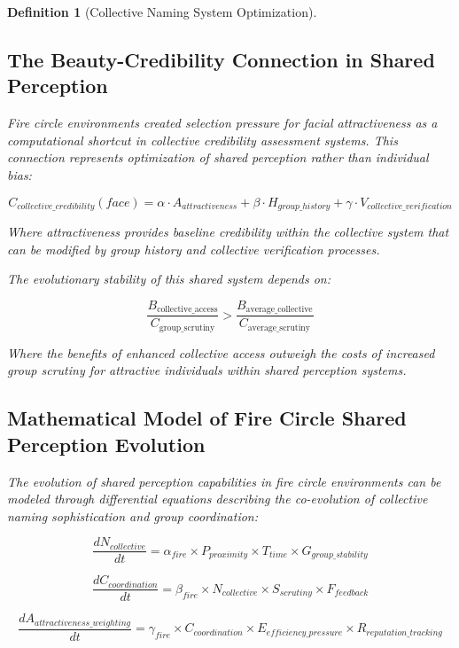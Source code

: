 \documentclass[12pt]{article}
\newtheorem{definition}{Definition}
\begin{document}
\begin{definition}[Collective Naming System Optimization]
\subsection{The Beauty-Credibility Connection in Shared Perception}

Fire circle environments created selection pressure for facial attractiveness as a computational shortcut in collective credibility assessment systems. This connection represents optimization of shared perception rather than individual bias:

$$C_{collective\_credibility}(face) = \alpha \cdot A_{attractiveness} + \beta \cdot H_{group\_history} + \gamma \cdot V_{collective\_verification}$$

Where attractiveness provides baseline credibility within the collective system that can be modified by group history and collective verification processes.

The evolutionary stability of this shared system depends on:

$$\frac{B_{\text{collective\_access}}}{C_{\text{group\_scrutiny}}} > \frac{B_{\text{average\_collective}}}{C_{\text{average\_scrutiny}}}$$

Where the benefits of enhanced collective access outweigh the costs of increased group scrutiny for attractive individuals within shared perception systems.

\subsection{Mathematical Model of Fire Circle Shared Perception Evolution}

The evolution of shared perception capabilities in fire circle environments can be modeled through differential equations describing the co-evolution of collective naming sophistication and group coordination:

$$\frac{dN_{collective}}{dt} = \alpha_{fire} \times P_{proximity} \times T_{time} \times G_{group\_stability}$$

$$\frac{dC_{coordination}}{dt} = \beta_{fire} \times N_{collective} \times S_{scrutiny} \times F_{feedback}$$

$$\frac{dA_{attractiveness\_weighting}}{dt} = \gamma_{fire} \times C_{coordination} \times E_{efficiency\_pressure} \times R_{reputation\_tracking}$$


\end{definition}
\end{document}
